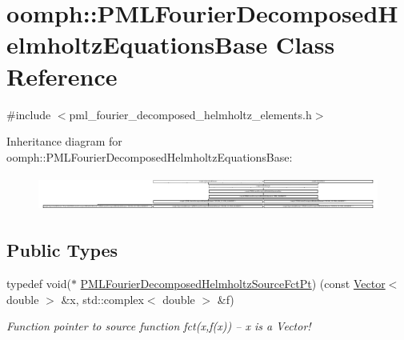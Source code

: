 \hypertarget{classoomph_1_1PMLFourierDecomposedHelmholtzEquationsBase}{}\section{oomph\+:\+:P\+M\+L\+Fourier\+Decomposed\+Helmholtz\+Equations\+Base Class Reference}
\label{classoomph_1_1PMLFourierDecomposedHelmholtzEquationsBase}


{\ttfamily \#include $<$pml\+\_\+fourier\+\_\+decomposed\+\_\+helmholtz\+\_\+elements.\+h$>$}

Inheritance diagram for oomph\+:\+:P\+M\+L\+Fourier\+Decomposed\+Helmholtz\+Equations\+Base\+:\begin{figure}[H]
\begin{center}
\leavevmode
\includegraphics[height=1.161826cm]{classoomph_1_1PMLFourierDecomposedHelmholtzEquationsBase}
\end{center}
\end{figure}
\subsection*{Public Types}
\begin{DoxyCompactItemize}
\item 
typedef void($\ast$ \hyperlink{classoomph_1_1PMLFourierDecomposedHelmholtzEquationsBase_a2e749d98392af2109b41dca0ae618b79}{P\+M\+L\+Fourier\+Decomposed\+Helmholtz\+Source\+Fct\+Pt}) (const \hyperlink{classoomph_1_1Vector}{Vector}$<$ double $>$ \&x, std\+::complex$<$ double $>$ \&f)
\begin{DoxyCompactList}\small\item\em Function pointer to source function fct(x,f(x)) -- x is a Vector! \end{DoxyCompactList}\end{DoxyCompactItemize}
